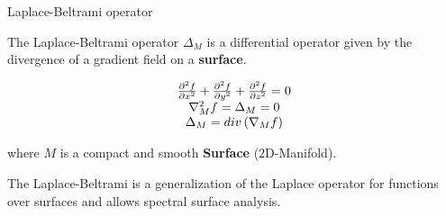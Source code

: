 \documentclass[10pt, compress, english]{beamer}
\begin{document}
\begin{frame}{Laplace-Beltrami operator}



\begin{block}{The Laplace-Beltrami operator $\Delta_{M}$ is a differential operator
given by the divergence of a gradient field on a \textbf{surface}.}


\[
\begin{array}[t]{c}
\frac{\partial^{2}f}{\partial x^{2}}+\frac{\partial^{2}f}{\partial y^{2}}+\frac{\partial^{2}f}{\partial z^{2}}=0\\
\nabla_{M}^{2}f=\Delta_{M}=0\\
\Delta_{M}=div\left(\nabla_{M}f\right)
\end{array}
\]


where $M$ is a compact and smooth \textbf{Surface} (2D-Manifold).
\end{block}

\pause{}

The Laplace-Beltrami is a generalization of the Laplace operator for functions over surfaces and allows spectral surface analysis.



\end{frame}
\end{document}
